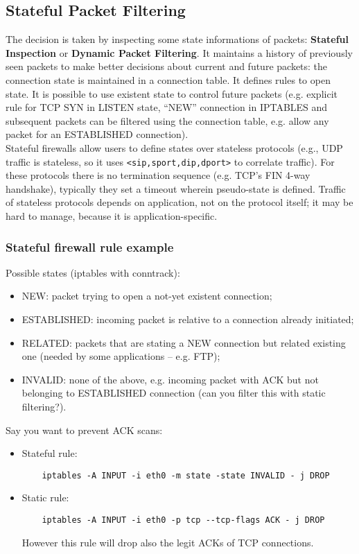 \documentclass[a4paper, 10pt, titlepage]{article}
\begin{document}
\subsection{Stateful Packet Filtering}
The decision is taken by inspecting some state informations of packets: \textbf{Stateful Inspection} or \textbf{Dynamic Packet Filtering}. It maintains a history of previously seen packets to make better decisions about current and future packets: the connection state is maintained in a connection table. It defines rules to open state. It is possible to use existent state to control future packets (e.g. explicit rule for TCP SYN in LISTEN state, “NEW” connection in IPTABLES and subsequent packets can be filtered using the connection table, e.g. allow any packet for an ESTABLISHED connection). \medskip\\
Stateful firewalls allow users to define states over stateless protocols (e.g., UDP traffic is stateless, so it uses \lstinline|<sip,sport,dip,dport>| to correlate traffic). For these protocols there is no termination sequence (e.g. TCP's FIN 4-way handshake), typically they set a timeout wherein pseudo-state is defined. Traffic of stateless protocols depends on application, not on the protocol itself; it may be hard to manage, because it is application-specific.

\subsubsection*{Stateful firewall rule example}
Possible states (iptables with conntrack):
\begin{itemize}
	\item NEW: packet trying to open a not-yet existent connection;
	\item ESTABLISHED: incoming packet is relative to a connection already initiated;
	\item RELATED: packets that are stating a NEW connection but related existing one (needed by some applications – e.g. FTP);
	\item INVALID: none of the above, e.g. incoming packet with ACK but not belonging to ESTABLISHED connection (can you filter this with static filtering?).
\end{itemize}
Say you want to prevent ACK scans:
\begin{itemize}
	\item Stateful rule:
	\begin{lstlisting}
	iptables -A INPUT -i eth0 -m state -state INVALID -	j DROP
	\end{lstlisting}
	\item Static rule:
	\begin{lstlisting}
	iptables -A INPUT -i eth0 -p tcp --tcp-flags ACK - j DROP
	\end{lstlisting}
	However this rule will drop also the legit ACKs of TCP connections.
\end{itemize}
\end{document}
